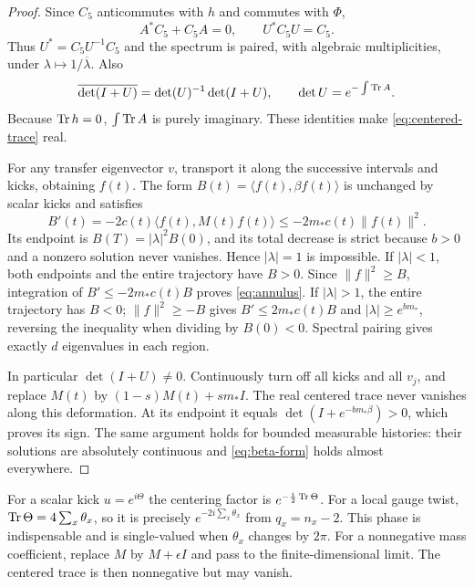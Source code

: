 \begin{proof}
Since $C_5$ anticommutes with $h$ and commutes with $\Phi$,
\[
 A^*C_5+C_5A=0,\qquad U^*C_5U=C_5.
\]
Thus $U^*=C_5U^{-1}C_5$ and the spectrum is paired, with
algebraic multiplicities, under $\lambda\mapsto1/\overline\lambda$.
Also
\[
 \overline{\det(I+U)}=\det(U)^{-1}\det(I+U),\qquad
 \det U=e^{-\int\operatorname{Tr} A}.
\]
Because $\operatorname{Tr} h=0$, $\int\operatorname{Tr} A$ is purely imaginary. These
identities make \eqref{eq:centered-trace} real.

For any transfer eigenvector $v$, transport it along the
successive intervals and kicks, obtaining $f(t)$.
The form $B(t)=\langle f(t),\beta f(t)\rangle$ is unchanged by
scalar kicks and satisfies
\begin{equation}
 B'(t)=-2c(t)\langle f(t),M(t)f(t)\rangle
       \le-2m_*c(t)\|f(t)\|^2.
 \label{eq:beta-form}
\end{equation}
Its endpoint is $B(T)=|\lambda|^2B(0)$, and its total decrease
is strict because $b>0$ and a nonzero solution never vanishes.
Hence $|\lambda|=1$ is impossible.
If $|\lambda|<1$, both endpoints and the entire trajectory
have $B>0$. Since $\|f\|^2\ge B$, integration of
$B'\le-2m_*c(t)B$ proves \eqref{eq:annulus}.
If $|\lambda|>1$, the entire trajectory has $B<0$;
$\|f\|^2\ge-B$ gives $B'\le2m_*c(t)B$ and
$|\lambda|\ge e^{bm_*}$, reversing the inequality when
dividing by $B(0)<0$. Spectral pairing gives exactly $d$
eigenvalues in each region.

In particular $\det(I+U)\ne0$. Continuously turn off all kicks
and all $v_j$, and replace $M(t)$ by
$(1-s)M(t)+sm_*I$. The real centered trace never vanishes
along this deformation. At its endpoint it equals
$\det(I+e^{-bm_*\beta})>0$, which proves its sign.
The same argument holds for bounded measurable histories:
their solutions are absolutely continuous and
\eqref{eq:beta-form} holds almost everywhere.
\end{proof}

For a scalar kick $u=e^{i\Theta}$ the centering factor is
$e^{-\frac i2\operatorname{Tr}\Theta}$. For a local gauge twist,
$\operatorname{Tr}\Theta=4\sum_x\theta_x$, so it is precisely
$e^{-2i\sum_x\theta_x}$ from $q_x=n_x-2$.
This phase is indispensable and is single-valued when
$\theta_x$ changes by $2\pi$.
For a nonnegative mass coefficient, replace $M$ by
$M+\epsilon I$ and pass to the finite-dimensional limit.
The centered trace is then nonnegative but may vanish.


